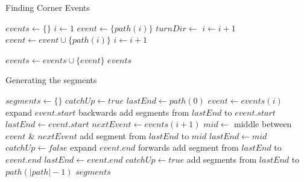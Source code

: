 \begin{algorithm}
\caption{Finding Corner Events}
\label{alg:corners}
\begin{algorithmic}[1]
  \State $events \leftarrow \{\}$ 
  \State $i \leftarrow 1$ 
   
  	\State $event \leftarrow \{ path(i) \}$ 
  	\State $turnDir \leftarrow$  
    	\State $i \leftarrow  i + 1$
    		\Break {}
	\EndIf
		\Break {}
	\EndIf
	\State $event \leftarrow event \cup \{ path(i) \}$
	\State $i \leftarrow  i + 1$
	
    	\EndWhile
    	
    	\State $events \leftarrow events \cup \{ event \}$
  \EndWhile
\Return $events$
\EndFunction
\end{algorithmic}
\end{algorithm}

\begin{algorithm}
\caption{Generating the segments}
\label{alg:segments}
\begin{algorithmic}[1]
\State $segments \leftarrow \{\}$
\State $catchUp \leftarrow true$
\State $lastEnd \leftarrow path(0)$
\State $event \leftarrow events(i)$
	\State expand $event.start$ backwards
	\State add segments from $lastEnd$ to $event.start$
	\State $lastEnd \leftarrow event.start$
\EndIf
\State $nextEvent \leftarrow events(i+1)$
	\State $mid \leftarrow$ middle between $event$ \& $nextEvent$
	\State add segment from $lastEnd$ to $mid$
	\State $lastEnd \leftarrow mid$
	\State $catchUp \leftarrow false$
\Else
	\State expand $event.end$ forwards
	\State add segment from $lastEnd$ to $event.end$
	\State $lastEnd \leftarrow event.end$
	\State $catchUp \leftarrow true$
\EndIf
\EndFor
\State add segments from $lastEnd$ to $path(|path|-1)$
\Return $segments$
\EndFunction
\end{algorithmic}
\end{algorithm}

